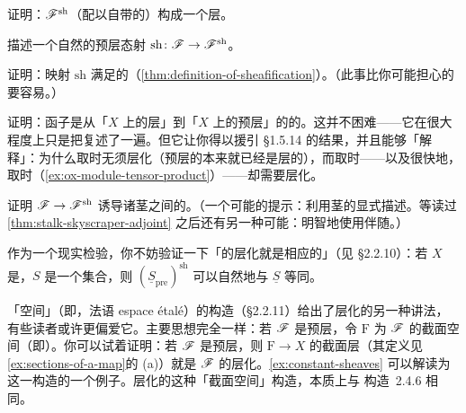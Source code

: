 \begin{exercise}[简单练习]\label{ex:sheafification-forms-sheaf}
证明：$\mathscr{F}^{\mathrm{sh}}$（配以自带的\trRestrictionMap）构成一个层。
\end{exercise}

\begin{exercise}[简单练习]\label{ex:sheafification-natural-map}
描述一个自然的预层态射 $\mathrm{sh}\colon\mathscr{F}\to\mathscr{F}^{\mathrm{sh}}$。
\end{exercise}

\begin{exercise}\label{ex:sheafification-universal-property}
证明：映射 $\mathrm{sh}$ 满足\trSheafification{}的\trUniversalProperty（\cref{thm:definition-of-sheafification}）。（此事比你可能担心的要容易。）
\end{exercise}

\begin{exercise}\label{ex:sheafification-left-adjoint}
证明：\trSheafification{}函子是从「$X$ 上的层」到「$X$ 上的预层」的\trForgetfulFunctor{}的\trLeftAdjoint。这并不困难——它在很大程度上只是把\trUniversalProperty{}复述了一遍。但它让你得以援引 \S1.5.14 的结果，并且能够「解释」：为什么取\trKernel{}时无须层化（预层的\trKernel{}本来就已经是层的\trKernel{}），而取\trCokernel{}时——以及很快地，取\trTensorProduct{}时（\cref{ex:ox-module-tensor-product}）——却需要层化。
\end{exercise}

\begin{exercise}[简单练习]\label{ex:sheafification-stalk-isomorphism}
证明 $\mathscr{F}\to\mathscr{F}^{\mathrm{sh}}$ 诱导诸茎之间的\trIsomorphism。（一个可能的提示：利用茎的显式描述。等读过 \cref{thm:stalk-skyscraper-adjoint} 之后还有另一种可能：明智地使用伴随。）
\end{exercise}

作为一个现实检验，你不妨验证一下「\trConstantPresheaf{}的层化就是相应的\trConstantSheaf」（见 \S2.2.10）：若 $X$ 是\trTopologicalSpace{}，$S$ 是一个集合，则 $(\underline{S}_{\mathrm{pre}})^{\mathrm{sh}}$ 可以自然地与 $\underline{S}$ 等同。

\begin{remark}[\hard]\label{thm:sheafification-espace-etale}
「\trSection{}空间」（即\trEspaceEtale，法语 espace étalé）的构造（\S2.2.11）给出了层化的另一种讲法，有些读者或许更偏爱它。主要思想完全一样：若 $\mathscr{F}$ 是预层，令 $\mathrm{F}$ 为 $\mathscr{F}$ 的截面空间（即\trEspaceEtale）。你可以试着证明：若 $\mathscr{F}$ 是预层，则 $\mathrm{F}\to X$ 的截面层（其定义见 \cref{ex:sections-of-a-map}的 (a)）就是 $\mathscr{F}$ 的层化。\cref{ex:constant-sheaves} 可以解读为这一构造的一个例子。层化的这种「截面空间」构造，本质上与 \mbox{构造~2.4.6} 相同。
\end{remark}

